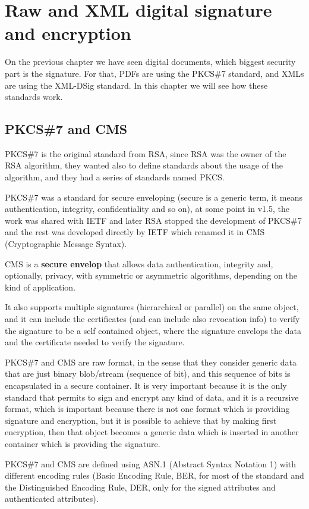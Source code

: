 \chapter{Raw and XML digital signature and encryption}
On the previous chapter we have seen digital documents, which biggest
security part is the signature. For that, PDFs are using the PKCS\#7 
standard, and XMLs are using the XML-DSig standard. In this chapter we 
will see how these standards work.
\section{PKCS\#7 and CMS}
PKCS\#7 is the original standard from RSA, since RSA was the owner of
the RSA algorithm, they wanted also to define standards about the
usage of the algorithm, and they had a series of standards named PKCS.

PKCS\#7 was a standard for secure enveloping (secure is a generic
term, it means authentication, integrity, confidentiality and so on),
at some point in v1.5, the work was shared with IETF and later RSA
stopped the development of PKCS\#7 and the rest was developed directly
by IETF which renamed it in CMS (Cryptographic Message Syntax).

\begin{boxH}
  CMS is a \textbf{secure envelop} that allows data authentication,
  integrity and, optionally, privacy, with symmetric or asymmetric
  algorithms, depending on the kind of application.
\end{boxH}

It also supports multiple signatures (hierarchical or parallel) on the
same object, and it can include the certificates (and can include also
revocation info) to verify the signature to be a self contained
object, where the signature envelops the data and the certificate 
needed to verify the signature.

PKCS\#7 and CMS are raw format, in the sense that they consider
generic data that are just binary blob/stream (sequence of bit), and
this sequence of bits is encapsulated in a secure container. It is
very important because it is the only standard that permits to sign
and encrypt any kind of data, and it is a recursive format, which is
important because there is not one format which is providing signature
and encryption, but it is possible to achieve that by making first
encryption, then that object becomes a generic data which is inserted
in another container which is providing the signature.

PKCS\#7 and CMS are defined using ASN.1 (Abstract Syntax Notation 1)
with different encoding rules (Basic Encoding Rule, BER, for most of
the standard and the Distinguished Encoding Rule, DER, only for the
signed attributes and authenticated attributes).

